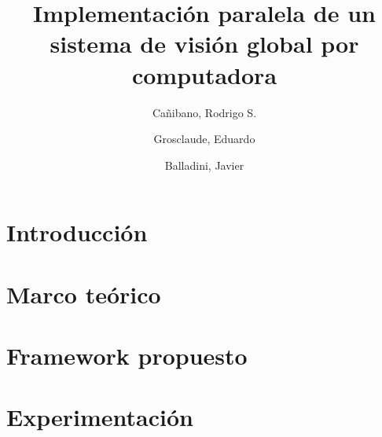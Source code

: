 \documentclass[11pt,a4paper,spanish]{book}
\title{Implementación paralela de un sistema de visión global por computadora}
\author{Cañibano, Rodrigo S.\and Grosclaude, Eduardo \and Balladini, Javier}
\begin{document}
\maketitle

\chapter{Introducción}











\chapter{Marco teórico}





\chapter{Framework propuesto}



\chapter{Experimentación}






\end{document}
